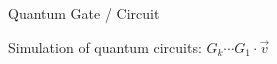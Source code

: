 \begin{frame}{Quantum Gate / Circuit}
~\\

\pause

Simulation of quantum circuits: $G_k \cdots G_1 \cdot \vec v$

\end{frame}




%
%
%

